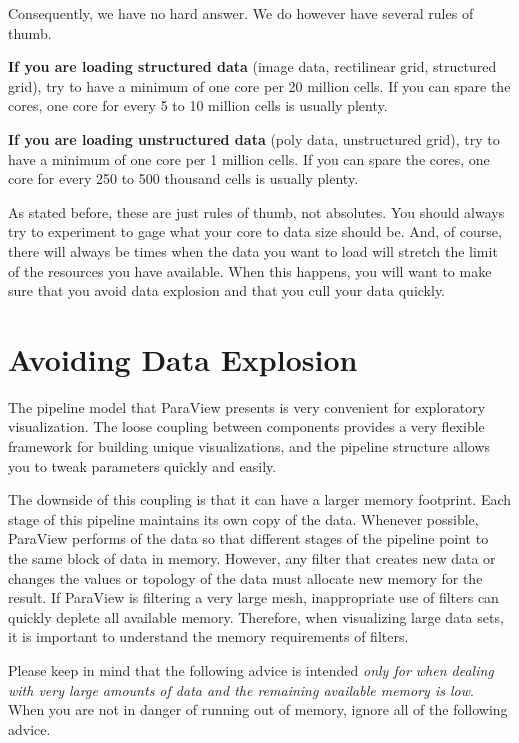 Consequently, we have no hard answer.  We do however have several rules of thumb.

\textbf{If you are loading structured data} (image data, rectilinear grid,
structured grid), try to have a minimum of one core per 20 million
cells.  If you can spare the cores, one core for every 5 to 10
million cells is usually plenty.

\textbf{If you are loading unstructured data} (poly data, unstructured
grid), try to have a minimum of one core per 1 million cells.  If you
can spare the cores, one core for every 250 to 500 thousand cells
is usually plenty.

As stated before, these are just rules of thumb, not absolutes.  You should
always try to experiment to gage what your core to data size should
be.  And, of course, there will always be times when the data you want to
load will stretch the limit of the resources you have available.  When this
happens, you will want to make sure that you avoid data explosion and that
you cull your data quickly.


\section{Avoiding Data Explosion}
\label{sec:AvoidingDataExplosion}

The pipeline model that ParaView presents is very convenient for
exploratory visualization.  The loose coupling between components provides
a very flexible framework for building unique visualizations, and the
pipeline structure allows you to tweak parameters quickly and easily.

The downside of this coupling is that it can have a larger memory
footprint.  Each stage of this pipeline maintains its own copy of the data.
Whenever possible, ParaView performs  of the data
so that different stages of the pipeline point to the same block of data in
memory.  However, any filter that creates new data or changes the values or
topology of the data must allocate new memory for the result.  If ParaView
is filtering a very large mesh, inappropriate use of filters can quickly
deplete all available memory.  Therefore, when visualizing large data sets,
it is important to understand the memory requirements of filters.

Please keep in mind that the following advice is intended \emph{only for
  when dealing with very large amounts of data and the remaining available
  memory is low}.  When you are not in danger of running out of memory,
ignore all of the following advice.

